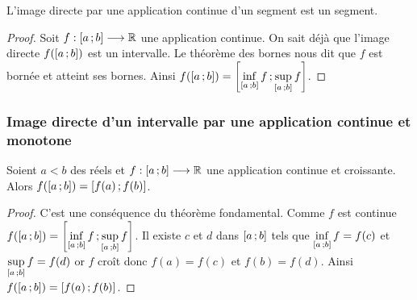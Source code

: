 \begin{theo}
  L'image directe par une application continue d'un segment est un segment.
\end{theo}
\begin{proof}
  Soit $f:\left[ a \, ;  b \right] \longrightarrow \mathbb{R}$ une application continue. On sait déjà que l'image directe $f(\left[ a \, ;  b \right])$ est un intervalle. Le théorème des bornes nous dit que $f$ est bornée et atteint ses bornes. Ainsi $f(\left[ a \, ;  b \right])=\left[ \inf\limits_{\left[ a \, ;  b \right]}f \, ;  \sup\limits_{\left[ a \, ;  b \right]}f \right]$.
\end{proof}

\subsubsection[Image directe d'un intervalle]{Image directe d'un intervalle par une application continue et monotone}

\begin{theo} \label{theo:imagesegment}
  Soient $a<b$ des réels et $f:\left[ a \, ;  b \right] \longrightarrow \mathbb{R}$ une application continue et croissante. Alors $f(\left[ a \, ;  b \right])=\left[ f(a) \, ;  f(b) \right]$.
\end{theo}
\begin{proof}
  C'est une conséquence du théorème fondamental. Comme $f$ est continue $f(\left[ a \, ;  b \right])=\left[ \inf\limits_{\left[ a \, ;  b \right]}f \, ;  \sup\limits_{\left[ a \, ;  b \right]}f \right]$. Il existe $c$ et $d$ dans $\left[ a \, ;  b \right]$ tels que $\inf\limits_{\left[ a \, ;  b \right]}f=f(c)$ et $\sup\limits_{\left[ a \, ;  b \right]}f=f(d)$ or $f$ croît donc $f(a)=f(c)$ et $f(b)=f(d)$. Ainsi $f(\left[ a \, ;  b \right])=\left[ f(a) \, ;  f(b) \right]$.
\end{proof}

